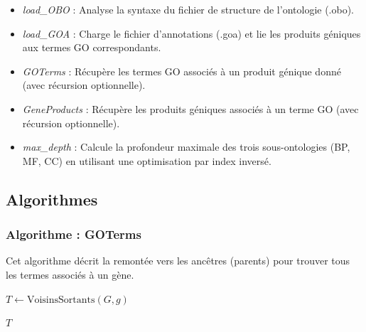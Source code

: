 \documentclass[12pt,a4paper]{article}
\begin{document}
\begin{itemize}
    \item \textit{load\_OBO} : Analyse la syntaxe du fichier de structure de l'ontologie (.obo).
    \item \textit{load\_GOA} : Charge le fichier d'annotations (.goa) et lie les produits géniques aux termes GO correspondants.
    \item \textit{GOTerms} : Récupère les termes GO associés à un produit génique donné (avec récursion optionnelle).
    \item \textit{GeneProducts} : Récupère les produits géniques associés à un terme GO (avec récursion optionnelle).
    \item \textit{max\_depth} : Calcule la profondeur maximale des trois sous-ontologies (BP, MF, CC) en utilisant une optimisation par index inversé.
\end{itemize}

\subsection{Algorithmes}

\subsubsection{Algorithme : GOTerms}
Cet algorithme décrit la remontée vers les ancêtres (parents) pour trouver tous les termes associés à un gène.


\begin{algorithm}[H]
    \caption{Récupération des termes GO d'un produit génique}


    $T \leftarrow \text{VoisinsSortants}(G, g)$\;

    \Return $T$\;
\end{algorithm}
\end{document}
